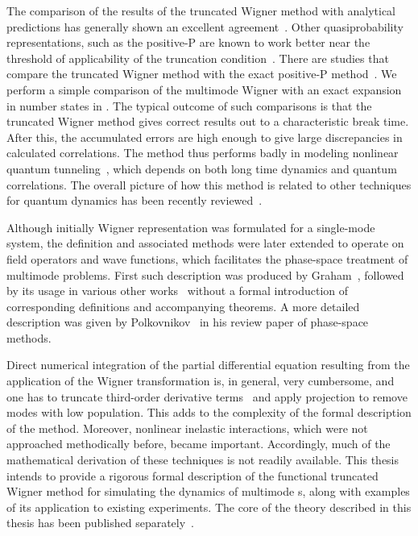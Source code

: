 The comparison of the results of the truncated Wigner method with analytical predictions has generally shown an excellent agreement~\cite{Corney2006,Deuar2007}.
Other quasiprobability representations, such as the positive-P are known to work better near the threshold of applicability of the truncation condition~\cite{Deuar2007,Hoffmann2008}.
There are studies that compare the truncated Wigner method with the exact positive-P method~\cite{Chaturvedi2002,Dechoum2004}.
We perform a simple comparison of the multimode Wigner with an exact expansion in number states in .
The typical outcome of such comparisons is that the truncated Wigner method gives correct results out to a characteristic break time.
After this, the accumulated errors are high enough to give large discrepancies in calculated correlations.
The method thus performs badly in modeling nonlinear quantum tunneling~\cite{Drummond1989,Kinsler1991a}, which depends on both long time dynamics and quantum correlations.
The overall picture of how this method is related to other techniques for quantum dynamics has been recently reviewed~\cite{He2012}.

Although initially Wigner representation was formulated for a single-mode system, the definition and associated methods were later extended to operate on field operators and wave functions, which facilitates the phase-space treatment of multimode problems.
First such description was produced by Graham~\cite{Graham1970,Graham1970a}, followed by its usage in various other works~\cite{Steel1998,Gardiner2003,Isella2006,Norrie2006,Norrie2006a,Blakie2008,Martin2010} without a formal introduction of corresponding definitions and accompanying theorems.
A more detailed description was given by Polkovnikov~\cite{Polkovnikov2010} in his review paper of phase-space methods.

Direct numerical integration of the partial differential equation resulting from the application of the Wigner transformation is, in general, very cumbersome, and one has to truncate third-order derivative terms~\cite{Drummond1993,Steel1998,Sinatra2002} and apply projection to remove modes with low population.
This adds to the complexity of the formal description of the method.
Moreover, nonlinear inelastic interactions, which were not approached methodically before, became important.
Accordingly, much of the mathematical derivation of these techniques is not readily available.
This thesis intends to provide a rigorous formal description of the functional truncated Wigner method for simulating the dynamics of multimode s, along with examples of its application to existing experiments.
The core of the theory described in this thesis has been published separately~\cite{Opanchuk2013}.



